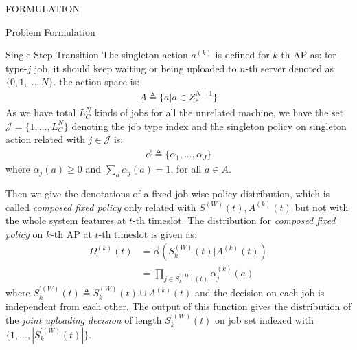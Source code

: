 \documentclass[10pt, conference, letterpaper]{IEEEtran}
\begin{document}
\begin{section}{FORMULATION}
\begin{subsection}{Problem Formulation}
\begin{subsubsection}{Single-Step Transition}
                The singleton action $a^{(k)}$ is defined for $k$-th AP as: for type-$j$ job, it should keep waiting or being uploaded to $n$-th server denoted as $\{0,1,\dots,N\}$. the action space is:
                \begin{align}
                    A \triangleq \{a|a \in Z_*^{N+1}\}
                \end{align}
                As we have total $L_C^{N}$ kinds of jobs for all the unrelated machine, we have the set $\mathcal{J}=\{1, \dots, L_C^{N}\}$ denoting the job type index and the singleton policy on singleton action related with $j \in \mathcal{J}$ is:
                \begin{align}
                    \vec{\alpha} \triangleq \{\alpha_1,\dots,\alpha_{J}\}
                \end{align}
                where $\alpha_j(a) \geq 0$ and $\sum_a \alpha_j(a) = 1$, for all $a \in A$.

                Then we give the denotations of a fixed job-wise policy distribution, which is called \emph{composed fixed policy} only related with $S^{(W)}(t), A^{(k)}(t)$ but not with the whole system features at $t$-th timeslot. The distribution for \emph{composed fixed policy} on $k$-th AP at $t$-th timeslot is given as:
                \begin{align}
                    \Omega^{(k)}(t) &= \vec{\alpha}( S^{(W)}_k(t) | A^{(k)}(t) )
                    \nonumber\\
                    &= \prod_{j \in S^{'(W)}_k(t)} \alpha^{(k)}_j(a)
                \end{align}
                where $S^{'(W)}_k(t) \triangleq S^{(W)}_k(t) \cup A^{(k)}(t)$ and the decision on each job is independent from each other. The output of this function gives the distribution of the \emph{joint uploading decision} of length $S^{'(W)}_k(t)$ on job set indexed with $\{1,\dots,|S^{'(W)}_k(t)|\}$.


\end{subsubsection}
\end{subsection}
\end{section}
\end{document}
